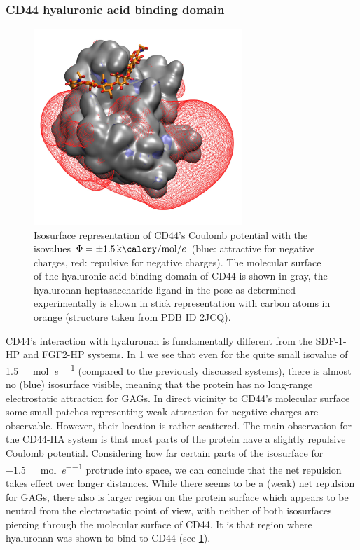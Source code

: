 \subsubsection{CD44 hyaluronic acid binding domain}

\begin{figure}
\centering
\includegraphics[width=0.7\textwidth]{gfx/bspred/2JCQ_isopot500_ligand_view1.jpg}
\caption[]{
Isosurface representation of CD44's Coulomb potential with the isovalues
$\Phi=\pm\SI{1.5}{\kilo\calory\per\mole\per\elementarycharge}$ (blue: attractive
for negative charges, red: repulsive for negative charges). The molecular
surface of the hyaluronic acid binding domain of CD44 is shown in gray, the
hyaluronan heptasaccharide ligand in the pose as determined experimentally is
shown in stick representation with carbon atoms in orange (structure taken from
PDB ID 2JCQ).}
\label{fig:bspred:cd44_estatic}
\end{figure}

CD44's interaction with hyaluronan is fundamentally different from the SDF-1-HP
and FGF2-HP systems. In \cref{fig:bspred:cd44_estatic} we see that even for the
quite small isovalue of \SI{1.5}{\kilo\calory\per\mole\per\elementarycharge}
(compared to the previously discussed systems), there is almost no (blue)
isosurface visible, meaning that the protein has no long-range electrostatic
attraction for GAGs. In direct vicinity to CD44's molecular surface some small
patches representing weak attraction for negative charges are observable.
However, their location is rather scattered. The main observation for the
CD44-HA system is that most parts of the protein have a slightly repulsive
Coulomb potential. Considering how far certain parts of the isosurface for
\SI{-1.5}{\kilo\calory\per\mole\per\elementarycharge} protrude into space, we
can conclude that the net repulsion takes effect over longer distances. While
there seems to be a (weak) net repulsion for GAGs, there also is larger region
on the protein surface which appears to be neutral from the electrostatic point
of view, with neither of both isosurfaces piercing through the molecular surface
of CD44. It is that region where hyaluronan was shown to bind to CD44 (see
\cref{fig:bspred:cd44_estatic}).


